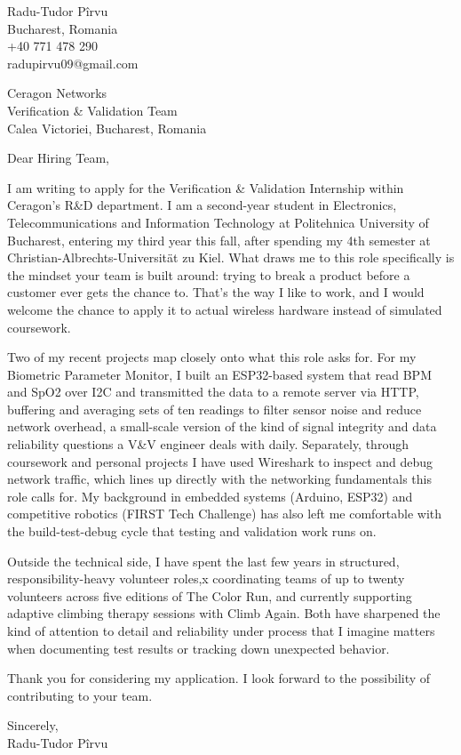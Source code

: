 \documentclass[11pt]{article}
\begin{document}
\noindent
Radu-Tudor P\^irvu \\
Bucharest, Romania \\
+40 771 478 290 \\
radupirvu09@gmail.com

\vspace{1.5em}
\noindent
Ceragon Networks \\
Verification \& Validation Team \\
Calea Victoriei, Bucharest, Romania

\vspace{1.5em}
\noindent
Dear Hiring Team,

I am writing to apply for the Verification \& Validation Internship within Ceragon's R\&D department. I am a second-year student in Electronics, Telecommunications and Information Technology at Politehnica University of Bucharest, entering my third year this fall, after spending my 4th semester at Christian-Albrechts-Universit\"at zu Kiel. What draws me to this role specifically is the mindset your team is built around: trying to break a product before a customer ever gets the chance to. That's the way I like to work, and I would welcome the chance to apply it to actual wireless hardware instead of simulated coursework.

Two of my recent projects map closely onto what this role asks for. For my Biometric Parameter Monitor, I built an ESP32-based system that read BPM and SpO2 over I2C and transmitted the data to a remote server via HTTP, buffering and averaging sets of ten readings to filter sensor noise and reduce network overhead, a small-scale version of the kind of signal integrity and data reliability questions a V\&V engineer deals with daily. Separately, through coursework and personal projects I have used Wireshark to inspect and debug network traffic, which lines up directly with the networking fundamentals this role calls for. My background in embedded systems (Arduino, ESP32) and competitive robotics (FIRST Tech Challenge) has also left me comfortable with the build-test-debug cycle that testing and validation work runs on.

Outside the technical side, I have spent the last few years in structured, responsibility-heavy volunteer roles,x coordinating teams of up to twenty volunteers across five editions of The Color Run, and currently supporting adaptive climbing therapy sessions with Climb Again. Both have sharpened the kind of attention to detail and reliability under process that I imagine matters when documenting test results or tracking down unexpected behavior.

Thank you for considering my application. I look forward to the possibility of contributing to your team.

Sincerely, \\
Radu-Tudor P\^irvu
\end{document}
